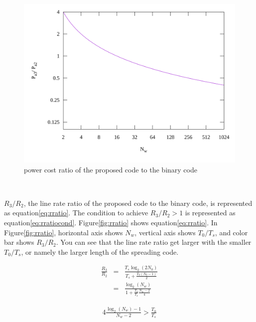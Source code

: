 \documentclass[dvipdfmx]{article}
\begin{document}
\begin{figure}[htbp]
  \begin{center}
    \includegraphics[clip, width=0.9\hsize, bb=0 0 800 600]{./resources/P.svg}
    \caption{power cost ratio of the proposed code to the binary code}
    \label{fig:pratio}
  \end{center}
\end{figure}
\, \newline

$R_{3}/R_{2}$, the line rate ratio of the proposed code to the binary code, is represented as equation\ref{eq:rratio}.
The condition to achieve $R_{3}/R_{2} > 1$ is represented as equation\ref{eq:rratiocond}.
Figure\ref{fig:rratio} shows equation\ref{eq:rratio}.
In Figure\ref{fig:rratio}, horizontal axis shows $N_{w}$, vertical axis shows $T_{0}/T_{s}$, and color bar shows $R_{3}/R_{2}$.
You can see that the line rate ratio get larger with the smaller $T_{0}/T_{s}$,
 or namely the larger length of the spreading code.

\begin{eqnarray}
    \frac{R_{3}}{R_{2}} &=& \frac{ T_{s}\log_2(2N_{0}) }{ T_{s}+\frac{T_{0}(N_{0}-1)}{2} } \nonumber \\
    	&=& \frac{ \log_2(N_{w}) }{ 1+\frac{T_{0}}{T_{s}} \frac{N_{w}-2}{4} }
    \label{eq:rratio}
\end{eqnarray}

\begin{eqnarray}
    4\frac{\log_2(N_{w})-1}{N_{w}-2} > \frac{T_{0}}{T_{s}}
    \label{eq:rratiocond}
\end{eqnarray}
\end{document}
